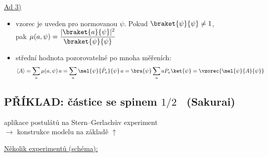\documentclass[11pt,a4paper]{article}
\begin{document}
\underline{Ad 3)}
\begin{itemize}[nosep]
  \item[--] vzorec je uveden pro normovanou $\psi$. Pokud $\braket{\psi}{\psi}\neq 1$, \\
            pak \quad $\mu(a,\psi) = \dfrac{|\braket{a}{\psi}|^2}{\braket{\psi}{\psi}}$
            \quad \pozn{$\leftarrow \ket{\psi}\to\dfrac{\ket{\psi}}{\sqrt{\braket{\psi}{\psi}}}$}
  \item[--] střední hodnota pozorovatelné po mnoha měřeních:
  \[
    \langle A\rangle = \sum_a \mu(a,\psi)\,a = \sum_a \mel{\psi}{\hat P_a}{\psi}\,a = \bra{\psi}\sum_a aP_a\ket{\psi}
    = \vzorec{\mel{\psi}{A}{\psi}}
  \]
\end{itemize}

\subsection*{PŘÍKLAD: částice se spinem $1/2$ \ (Sakurai)}
aplikace postulátů na Stern--Gerlachův experiment \\
\quad $\to$ konstrukce modelu na základě $\uparrow$

\underline{Několik experimentů (schéma):}
\end{document}
